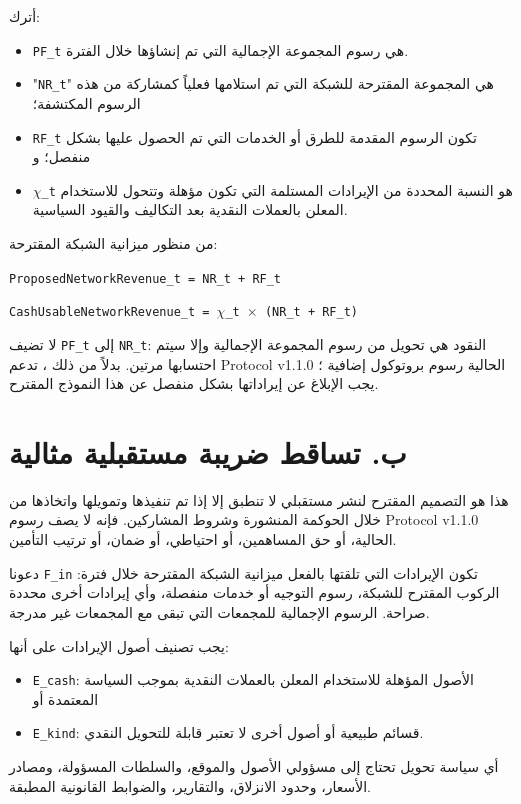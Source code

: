 \documentclass[11pt]{article}
\begin{document}
أترك:

\begin{itemize}[leftmargin=*]
\item \texttt{PF\_t} هي رسوم المجموعة الإجمالية التي تم إنشاؤها خلال الفترة.
\item "\texttt{NR\_t}" هي المجموعة المقترحة للشبكة التي تم استلامها فعلياً كمشاركة من هذه الرسوم المكتشفة؛
\item \texttt{RF\_t} تكون الرسوم المقدمة للطرق أو الخدمات التي تم الحصول عليها بشكل منفصل؛ و
\item \texttt{$\chi$\_t} هو النسبة المحددة من الإيرادات المستلمة التي تكون مؤهلة وتتحول للاستخدام المعلن بالعملات النقدية بعد التكاليف والقيود السياسية.
\end{itemize}
من منظور ميزانية الشبكة المقترحة:

\texttt{ProposedNetworkRevenue\_t = NR\_t + RF\_t}

\texttt{CashUsableNetworkRevenue\_t = $\chi$\_t $\times$ (NR\_t + RF\_t)}

لا تضيف \texttt{PF\_t} إلى \texttt{NR\_t}: النقود هي تحويل من رسوم المجموعة الإجمالية وإلا سيتم احتسابها مرتين. بدلاً من ذلك ، تدعم Protocol v1.1.0 الحالية رسوم بروتوكول إضافية ؛ يجب الإبلاغ عن إيراداتها بشكل منفصل عن هذا النموذج المقترح.


\section*{ب. تساقط ضريبة مستقبلية مثالية}

هذا هو التصميم المقترح لنشر مستقبلي لا تنطبق إلا إذا تم تنفيذها وتمويلها واتخاذها من خلال الحوكمة المنشورة وشروط المشاركين. فإنه لا يصف رسوم Protocol v1.1.0 الحالية، أو حق المساهمين، أو احتياطي، أو ضمان، أو ترتيب التأمين.

دعونا \texttt{F\_in} تكون الإيرادات التي تلقتها بالفعل ميزانية الشبكة المقترحة خلال فترة: الركوب المقترح للشبكة، رسوم التوجيه أو خدمات منفصلة، وأي إيرادات أخرى محددة صراحة. الرسوم الإجمالية للمجمعات التي تبقى مع المجمعات غير مدرجة.

يجب تصنيف أصول الإيرادات على أنها:

\begin{itemize}[leftmargin=*]
\item \texttt{E\_cash}: الأصول المؤهلة للاستخدام المعلن بالعملات النقدية بموجب السياسة المعتمدة أو
\item \texttt{E\_kind}: قسائم طبيعية أو أصول أخرى لا تعتبر قابلة للتحويل النقدي.
\end{itemize}
أي سياسة تحويل تحتاج إلى مسؤولي الأصول والموقع، والسلطات المسؤولة، ومصادر الأسعار، وحدود الانزلاق، والتقارير، والضوابط القانونية المطبقة.
\end{document}
